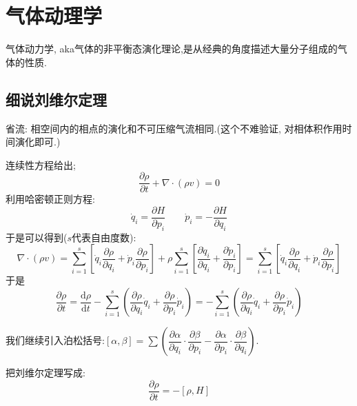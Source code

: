 
\section{气体动理学}
气体动力学, aka气体的非平衡态演化理论,是从经典的角度描述大量分子组成的气体的性质.
\subsection{细说刘维尔定理}
    省流: 相空间内的相点的演化和不可压缩气流相同.(这个不难验证, 对相体积作用时间演化即可.)

    连续性方程给出;
    \[\dfrac{\partial \rho}{\partial t}+\nabla \cdot (\rho v)=0\]
    利用哈密顿正则方程:
    \[\dot{q}_{i}=\dfrac{\partial H}{\partial p_{i}} \qquad \dot{p}_{i}=-\dfrac{\partial H}{\partial q_{i}}\]
    于是可以得到($s$代表自由度数):
    \[\nabla \cdot (\rho v)=\sum_{i=1}^{s}\left[ \dot{q}_{i}\dfrac{\partial \rho}{\partial q_{i}}+\dot{p}_{i}\dfrac{\partial \rho}{\partial p_{i}} \right] +\rho\sum_{i=1}^{s}\left[ \dfrac{\partial \dot{q}_{i}}{\partial q_{i}}+\dfrac{\partial \dot{p}_{i}}{\partial p_{i}} \right] =\sum_{i=1}^{s}\left[ \dot{q}_{i}\dfrac{\partial \rho}{\partial q_{i}}+\dot{p}_{i}\dfrac{\partial \rho}{\partial p_{i}} \right] \]
    于是 
    \begin{equation}
      \dfrac{\partial\rho}{\partial t}=\dfrac{\mathrm{d}  \rho}{\mathrm{d}  t}-\sum_{i=1}^{s}\left( \dfrac{\partial \rho}{\partial q_{i}}\dot{q}_{i}+\dfrac{\partial \rho}{\partial p_{i}}\dot{p}_{i} \right) = -\sum_{i=1}^{s}\left( \dfrac{\partial \rho}{\partial q_{i}}\dot{q}_{i}+\dfrac{\partial \rho}{\partial p_{i}}\dot{p}_{i} \right)
    \end{equation}

    我们继续引入泊松括号:$[\alpha,\beta]=\sum \left( \dfrac{\partial \alpha}{\partial q_{i}}\cdot \dfrac{\partial \beta}{\partial p_{i}}-\dfrac{\partial \alpha}{\partial p_{i}}\cdot \dfrac{\partial \beta}{\partial q_{i}} \right)$. 
    
    \vspace*{0.2cm}
    
    把刘维尔定理写成:
    \begin{equation}
      \dfrac{\partial \rho}{\partial t}=-[\rho,H]
    \end{equation}

